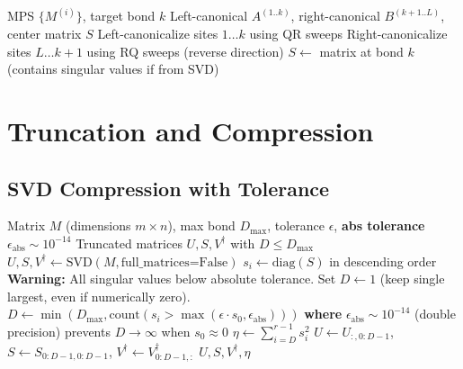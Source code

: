 \documentclass[aps,prb,onecolumn,scriptaddress]{revtex4-2}
\newcommand{\eps}{\epsilon}
\begin{document}
	\begin{algorithm}[H]
		\caption{BringToBond\\
			\textit{Numerical Note:} RQ decomposition (used for right-canonicalization) is less stable than QR and may not be available in all libraries (e.g., PyTorch). Alternative: Reverse the site order, apply \textsc{LeftCanonicalize}, then reverse back.}
		\begin{algorithmic}[1]
			\Require MPS $\{M^{(i)}\}$, target bond $k$
			\Ensure Left-canonical $A^{(1..k)}$, right-canonical $B^{(k+1..L)}$, center matrix $S$
			\State Left-canonicalize sites $1 \dots k$ using QR sweeps
			\State Right-canonicalize sites $L \dots k+1$ using RQ sweeps (reverse direction)
			\State $S \gets$ matrix at bond $k$ (contains singular values if from SVD)
		\end{algorithmic}
	\end{algorithm}
	
	\section{Truncation and Compression}
	
	\subsection{SVD Compression with Tolerance}
	\begin{algorithm}[H]
		\caption{TruncateBond}
		\begin{algorithmic}[1]
			\Require Matrix $M$ (dimensions $m \times n$), max bond $D_{\max}$, tolerance $\eps$, \textbf{abs tolerance $\eps_{\text{abs}} \sim 10^{-14}$}
			\Ensure Truncated matrices $U, S, V^\dagger$ with $D \leq D_{\max}$
			\State $U, S, V^\dagger \gets \text{SVD}(M, \text{full\_matrices=False})$
			\State $s_i \gets \text{diag}(S)$ in descending order
			\State {}
			\State {}
			\If{$s_0 < \eps_{\text{abs}}$}
			\State \textbf{Warning:} All singular values below absolute tolerance.
			\State Set $D \gets 1$ (keep single largest, even if numerically zero).
			\Else
			\State $D \gets \min\left(D_{\max}, \text{count}\left(s_i > \max\left(\eps \cdot s_0, \eps_{\text{abs}}\right)\right)\right)$
			\State \textbf{where} $\eps_{\text{abs}} \sim 10^{-14}$ (double precision) prevents $D \to \infty$ when $s_0 \approx 0$
			\EndIf
			\State {}
			\State $\eta \gets \sum_{i=D}^{r-1} s_i^2$ 
			\State $U \gets U_{:,0:D-1}$, $S \gets S_{0:D-1,0:D-1}$, $V^\dagger \gets V^\dagger_{0:D-1,:}$
			\State \Return $U, S, V^\dagger, \eta$
		\end{algorithmic}
	\end{algorithm}
	
\end{document}
